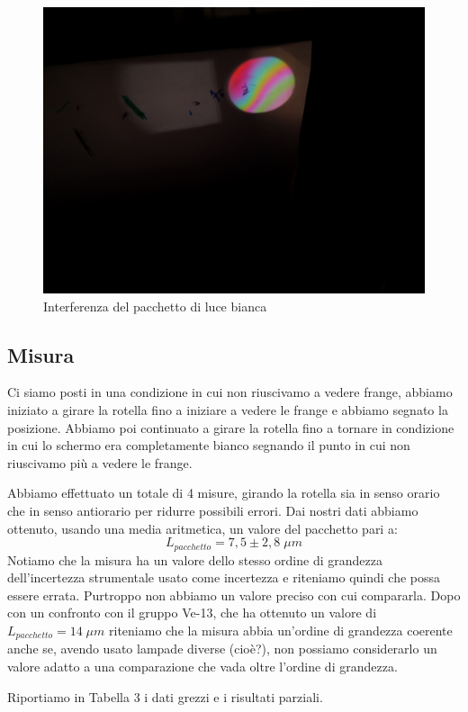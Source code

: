 \documentclass{article}
\begin{document}
\begin{figure}[h!]
  \centering
  \includegraphics[width=0.6\linewidth]{IM pacchetto}
  \caption{Interferenza del pacchetto di luce bianca}
\end{figure}


\subsection{Misura}
Ci siamo posti in una condizione in cui non riuscivamo a vedere frange, abbiamo iniziato a girare la rotella fino a iniziare a vedere le frange e abbiamo segnato la posizione. Abbiamo poi continuato a girare la rotella fino a tornare in condizione in cui lo schermo era completamente bianco segnando il punto in cui non riuscivamo più a vedere le frange.

\vspace{3mm}

Abbiamo effettuato un totale di 4 misure, girando la rotella sia in senso orario che in senso antiorario per ridurre possibili errori. Dai nostri dati abbiamo ottenuto, usando una media aritmetica, un valore del pacchetto pari a:
\[ L_{pacchetto} = 7,5 \pm 2,8 \; \mu m \]
Notiamo che la misura ha un valore dello stesso ordine di grandezza dell'incertezza strumentale usato come incertezza e riteniamo quindi che possa essere errata. Purtroppo non abbiamo un valore preciso con cui compararla. Dopo con un confronto con il gruppo Ve-13, che ha ottenuto un valore di $L_{pacchetto}=14 \; \mu m$ riteniamo che la misura abbia un'ordine di grandezza coerente anche se, avendo usato lampade diverse (cioè?), non possiamo considerarlo un valore adatto a una comparazione che vada oltre l'ordine di grandezza.

\vspace{3mm}

Riportiamo in Tabella 3 i dati grezzi e i risultati parziali.
\end{document}
